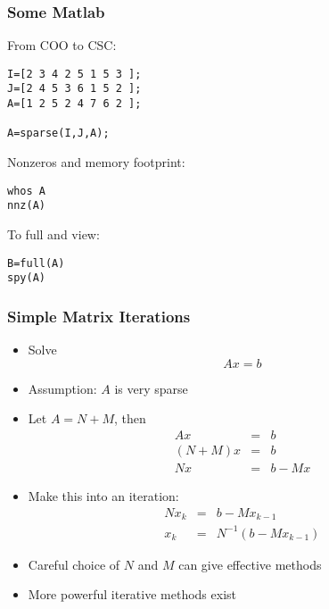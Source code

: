 \documentclass[10pt]{beamer}
\newcommand{\R}{{\mathbb{R}}}
\begin{document}
\begin{frame}[fragile]
\frametitle{Some Matlab}
From COO to CSC:
\begin{lstlisting}
I=[2 3 4 2 5 1 5 3 ];
J=[2 4 5 3 6 1 5 2 ];
A=[1 2 5 2 4 7 6 2 ];

A=sparse(I,J,A);
\end{lstlisting}
\bigskip

Nonzeros and memory footprint:
\begin{lstlisting}
whos A
nnz(A)
\end{lstlisting}
\bigskip

To full and view:
\begin{lstlisting}
B=full(A)
spy(A)
\end{lstlisting}
\end{frame}
\begin{frame}
\frametitle{Simple Matrix Iterations}
  \begin{itemize}
    \item Solve
      \begin{equation*}
        A x= b
      \end{equation*}
    \item Assumption: $A$ is very sparse
    \item Let $A = N + M$, then
      \begin{eqnarray*}
        A x &=& b\\
        (N+M)x &=& b\\
        Nx &=& b - Mx
      \end{eqnarray*}
    \item Make this into an iteration:
      \begin{eqnarray*}
        Nx_k &=& b - M x_{k-1}\\
        x_k &=& N^{-1}(b - M x_{k-1})
      \end{eqnarray*}
    \item Careful choice of $N$ and $M$ can give effective methods
    \item More powerful iterative methods exist
    \end{itemize}
\end{frame}
\end{document}

